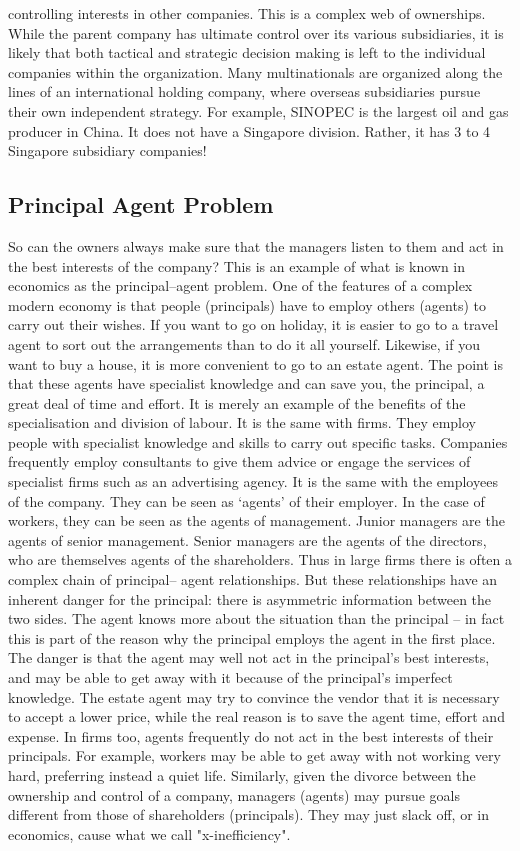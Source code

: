 controlling interests in other companies. This is a complex web of ownerships. While the parent company has ultimate control over its various subsidiaries, it is likely that both tactical and strategic decision making is left to the individual companies within the organization. Many multinationals are organized along the lines of an international holding company, where overseas subsidiaries pursue their own independent strategy. For example, SINOPEC is the largest oil and gas producer in China. It does not have a Singapore division. Rather, it has 3 to 4 Singapore subsidiary companies!
\subsection{Principal Agent Problem}
 So can the owners always make sure that the managers listen to them and act in the best interests of the company? This is an example of what is known in economics as the principal–agent problem. One of the features of a complex modern economy is that people (principals) have to employ others (agents) to carry out their wishes. If you want to go on holiday, it is easier to go to a travel agent to sort out the arrangements than to do it all yourself. Likewise, if you want to buy a house, it is more convenient to go to an estate agent. The point is that these agents have specialist knowledge and can save you, the principal, a great deal of time and effort. It is merely an example of the benefits of the specialisation and division of labour. It is the same with firms. They employ people with specialist knowledge and skills to carry out specific tasks. Companies frequently employ consultants to give them advice or engage the services of specialist firms such as an advertising agency. It is the same with the employees of the company. They can be seen as ‘agents' of their employer. In the case of workers, they can be seen as the agents of management. Junior managers are the agents of senior management. Senior managers are the agents of the directors, who are themselves agents of the shareholders. Thus in large firms there is often a complex chain of principal– agent relationships. But these relationships have an inherent danger for the principal: there is asymmetric information between the two sides. The agent knows more about the situation than the principal – in fact this is part of the reason why the principal employs the agent in the first place. The danger is that the agent may well not act in the principal's best interests, and may be able to get away with it because of the principal's imperfect knowledge. The estate agent may try to convince the vendor that it is necessary to accept a lower price, while the real reason is to save the agent time, effort and expense. In firms too, agents frequently do not act in the best interests of their principals. For example, workers may be able to get away with not working very hard, preferring instead a quiet life. Similarly, given the divorce between the ownership and control of a company, managers (agents) may pursue goals different from those of shareholders (principals). They may just slack off, or in economics, cause what we call "x-inefficiency".
